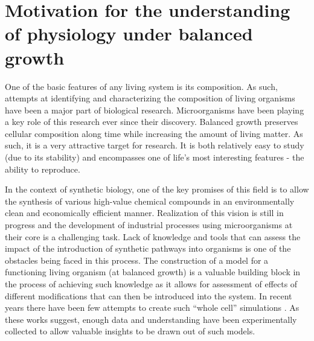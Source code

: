 \documentclass{report}
\begin{document}
\section{Motivation for the understanding of physiology under balanced growth}
One of the basic features of any living system is its composition.
As such, attempts at identifying and characterizing the composition of living organisms have been a major part of biological research\cite{Schaechter1958,Bremer1987}.
Microorganisms have been playing a key role of this research ever since their discovery.
Balanced growth preserves cellular composition along time while increasing the amount of living matter.
As such, it is a very attractive target for research.
It is both relatively easy to study (due to its stability) and encompasses one of life's most interesting features - the ability to reproduce.

In the context of synthetic biology, one of the key promises of this field is to allow the synthesis of various high-value chemical compounds in an environmentally clean and economically efficient manner.
Realization of this vision is still in progress and the development of industrial processes using microorganisms at their core is a challenging task.
Lack of knowledge and tools that can assess the impact of the introduction of synthetic pathways into organisms is one of the obstacles being faced in this process.
The construction of a model for a functioning living organism (at balanced growth) is a valuable building block in the process of achieving such knowledge as it allows for assessment of effects of different modifications that can then be introduced into the system.
In recent years there have been few attempts to create such “whole cell” simulations \cite{Lerman2012,Karr2012,Reed2004,Schellenberger2011a}.
As these works suggest, enough data and understanding have been experimentally collected to allow valuable insights to be drawn out of such models.
\end{document}
